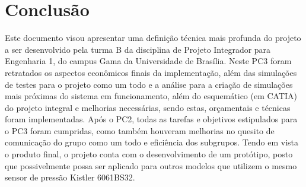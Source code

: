 \chapter{Conclusão}
  Este documento visou apresentar uma definição técnica mais profunda do projeto a ser desenvolvido pela turma B da disciplina de Projeto Integrador para Engenharia 1, do campus Gama da Universidade de Brasília. Neste PC3 foram retratados os aspectos econômicos finais da implementação, além das simulações de testes para o projeto como um todo e a análise para a criação de simulações mais próximas do sistema em funcionamento, além do esquemático (em CATIA) do projeto integral e melhorias necessárias, sendo estas, orçamentais e técnicas foram implementadas. Após o PC2, todas as tarefas e objetivos estipulados para o PC3 foram cumpridas, como também houveram melhorias no quesito de comunicação do grupo como um todo e eficiência dos subgrupos. Tendo em vista o produto final, o projeto conta com o desenvolvimento de um protótipo, posto que possivelmente possa ser aplicado para outros modelos que utilizem o mesmo sensor de pressão Kistler 6061BS32. 
